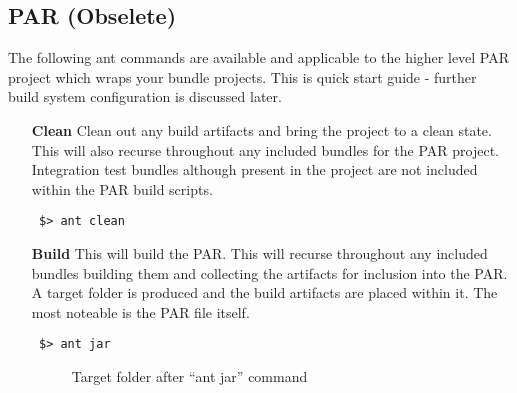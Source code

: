 \subsection{PAR (Obselete)}
The following ant commands are available and applicable to the higher level PAR project which
wraps your bundle projects. This is quick start guide - further build system configuration
is discussed later.

\begin{itemize}
\item[\textbf{Clean}] Clean out any build artifacts and bring the project to a clean state.
This will also recurse throughout any included bundles for the PAR project. Integration
test bundles although present in the project are not included within the PAR build scripts.
\begin{verbatim}
 $> ant clean
\end{verbatim}
\item[\textbf{Build}] This will build the PAR. This will recurse throughout any included
bundles building them and collecting the artifacts for inclusion into the PAR. A target
folder is produced and the build artifacts are placed within it. The most noteable is 
the PAR file itself.
\begin{verbatim}
 $> ant jar
\end{verbatim}
\begin{figure}[H]
\caption{Target folder after ``ant jar'' command}
\end{figure}


\end{itemize}
